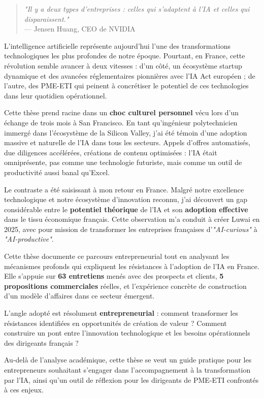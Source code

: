 \begin{quote}
\textit{"Il y a deux types d'entreprises : celles qui s'adaptent à l'IA et celles qui disparaissent."} \\
--- Jensen Huang, CEO de NVIDIA
\end{quote}

L'intelligence artificielle représente aujourd'hui l'une des transformations technologiques les plus profondes de notre époque. Pourtant, en France, cette révolution semble avancer à deux vitesses : d'un côté, un écosystème startup dynamique et des avancées réglementaires pionnières avec l'IA Act européen ; de l'autre, des PME-ETI qui peinent à concrétiser le potentiel de ces technologies dans leur quotidien opérationnel.

Cette thèse prend racine dans un \textbf{choc culturel personnel} vécu lors d'un échange de trois mois à San Francisco. En tant qu'ingénieur polytechnicien immergé dans l'écosystème de la Silicon Valley, j'ai été témoin d'une adoption massive et naturelle de l'IA dans tous les secteurs. Appels d'offres automatisés, due diligences accélérées, créations de contenu optimisées : l'IA était omniprésente, pas comme une technologie futuriste, mais comme un outil de productivité aussi banal qu'Excel.

Le contraste a été saisissant à mon retour en France. Malgré notre excellence technologique et notre écosystème d'innovation reconnu, j'ai découvert un gap considérable entre le \textbf{potentiel théorique} de l'IA et son \textbf{adoption effective} dans le tissu économique français. Cette observation m'a conduit à créer Luwai en 2025, avec pour mission de transformer les entreprises françaises d'\textit{"AI-curious"} à \textit{"AI-productive"}.

Cette thèse documente ce parcours entrepreneurial tout en analysant les mécanismes profonds qui expliquent les résistances à l'adoption de l'IA en France. Elle s'appuie sur \textbf{63 entretiens} menés avec des prospects et clients, \textbf{5 propositions commerciales} réelles, et l'expérience concrète de construction d'un modèle d'affaires dans ce secteur émergent.

L'angle adopté est résolument \textbf{entrepreneurial} : comment transformer les résistances identifiées en opportunités de création de valeur ? Comment construire un pont entre l'innovation technologique et les besoins opérationnels des dirigeants français ?

Au-delà de l'analyse académique, cette thèse se veut un guide pratique pour les entrepreneurs souhaitant s'engager dans l'accompagnement à la transformation par l'IA, ainsi qu'un outil de réflexion pour les dirigeants de PME-ETI confrontés à ces enjeux.
